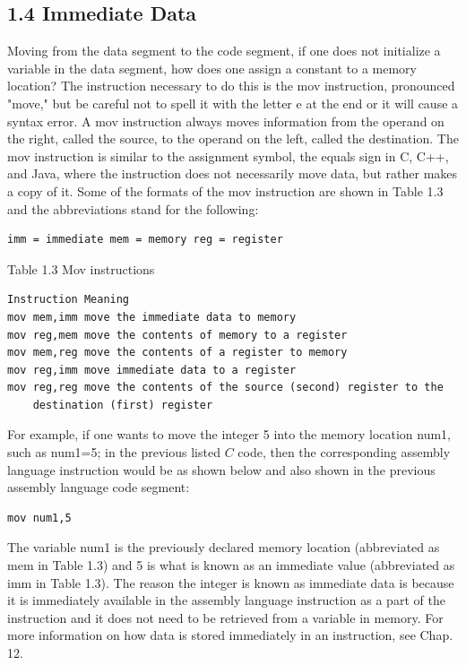 \documentclass[10pt]{article}
\begin{document}
\subsection*{1.4 Immediate Data}
Moving from the data segment to the code segment, if one does not initialize a variable in the data segment, how does one assign a constant to a memory location? The instruction necessary to do this is the mov instruction, pronounced "move," but be careful not to spell it with the letter e at the end or it will cause a syntax error. A mov instruction always moves information from the operand on the right, called the source, to the operand on the left, called the destination. The mov instruction is similar to the assignment symbol, the equals sign in C, C++, and Java, where the instruction does not necessarily move data, but rather makes a copy of it. Some of the formats of the mov instruction are shown in Table 1.3 and the abbreviations stand for the following:

\begin{verbatim}
imm = immediate mem = memory reg = register
\end{verbatim}

Table 1.3 Mov instructions

\begin{verbatim}
Instruction Meaning
mov mem,imm move the immediate data to memory
mov reg,mem move the contents of memory to a register
mov mem,reg move the contents of a register to memory
mov reg,imm move immediate data to a register
mov reg,reg move the contents of the source (second) register to the
    destination (first) register
\end{verbatim}

For example, if one wants to move the integer 5 into the memory location num1, such as num1=5; in the previous listed $C$ code, then the corresponding assembly language instruction would be as shown below and also shown in the previous assembly language code segment:

\begin{verbatim}
mov num1,5
\end{verbatim}

The variable num1 is the previously declared memory location (abbreviated as mem in Table 1.3) and 5 is what is known as an immediate value (abbreviated as imm in Table 1.3). The reason the integer is known as immediate data is because it is immediately available in the assembly language instruction as a part of the instruction and it does not need to be retrieved from a variable in memory. For more information on how data is stored immediately in an instruction, see Chap. 12.
\end{document}
